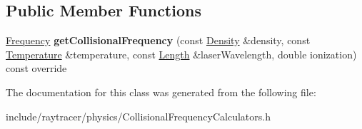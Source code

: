\subsection*{Public Member Functions}
\begin{DoxyCompactItemize}
\item 
\mbox{\label{classraytracer_1_1physics_1_1SpitzerFrequencyCalculator_a709e8207919a6184669e3b3891b65758}} 
\hyperlink{structraytracer_1_1physics_1_1Frequency}{Frequency} {\bfseries get\+Collisional\+Frequency} (const \hyperlink{structraytracer_1_1physics_1_1Density}{Density} \&density, const \hyperlink{structraytracer_1_1physics_1_1Temperature}{Temperature} \&temperature, const \hyperlink{structraytracer_1_1physics_1_1Length}{Length} \&laser\+Wavelength, double ionization) const override
\end{DoxyCompactItemize}


The documentation for this class was generated from the following file\+:\begin{DoxyCompactItemize}
\item 
include/raytracer/physics/Collisional\+Frequency\+Calculators.\+h\end{DoxyCompactItemize}
